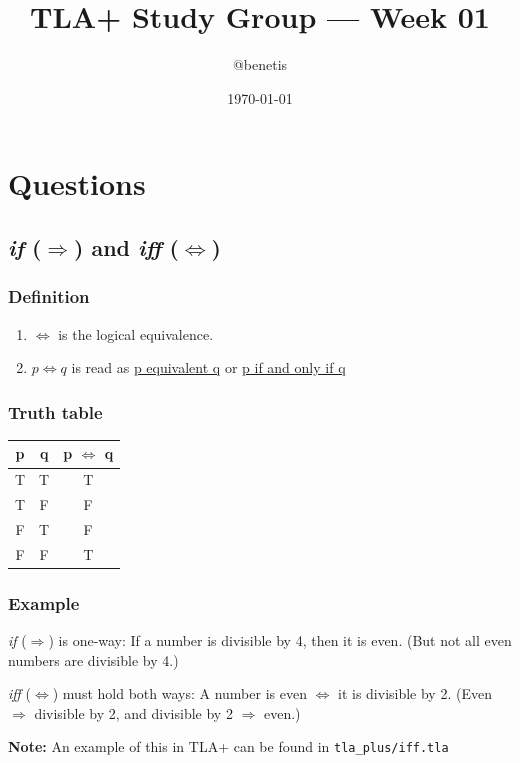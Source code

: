 \documentclass[11pt]{article}
\title{TLA+ Study Group — Week 01}
\author{@benetis}
\date{\today}
\begin{document}
\maketitle

\section{Questions}

\subsection{\textit{if} ($\Rightarrow$) and \textit{iff} ($\Leftrightarrow$)}

\subsubsection*{Definition}
\begin{enumerate}
  \item $\Leftrightarrow$ is the logical equivalence.
  \item $p \Leftrightarrow q$ is read as \underline{p equivalent q} or \underline{p if and only if q}
\end{enumerate}

\subsubsection*{Truth table}

\begin{tabular}{c|c|c}
p & q & p $\Leftrightarrow$ q \\
\hline 
T & T & T \\
T & F & F \\
F & T & F \\
F & F & T \\
\end{tabular}

\subsubsection*{Example}
\textit{if} ($\Rightarrow$) is one-way: If a number is divisible by 4, then it is even. (But not all even numbers are divisible by 4.)

\noindent\textit{iff} ($\Leftrightarrow$) must hold both ways: A number is even $\Leftrightarrow$ it is divisible by 2. (Even $\Rightarrow$ divisible by 2, and divisible by 2 $\Rightarrow$ even.)

\noindent\textbf{Note:} An example of this in TLA+ can be found in \texttt{tla\_plus/iff.tla}
\end{document}
